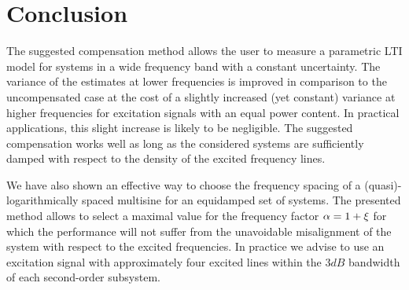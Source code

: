 \section{Conclusion} \label{sec:conclusion}
The suggested compensation method allows the user to measure a parametric LTI model for systems in a wide frequency band with a constant uncertainty.
The variance of the estimates at lower frequencies is improved in comparison to the uncompensated case at the cost of a slightly increased (yet constant) variance at higher frequencies for excitation signals with an equal power content.
In practical applications, this slight increase is likely to be negligible.
The suggested compensation works well as long as the considered systems are sufficiently damped with respect to the density of the excited frequency lines.

We have also shown an effective way to choose the frequency spacing of a (quasi)-logarithmically spaced multisine for an equidamped set of systems.
The presented method allows to select a maximal value for the frequency factor $\alpha = 1 + \xi$ for which the performance will not suffer from the unavoidable misalignment of the system with respect to the excited frequencies.
In practice we advise to use an excitation signal with approximately four excited lines within the $3\unit{dB}$ bandwidth of each second-order subsystem.

